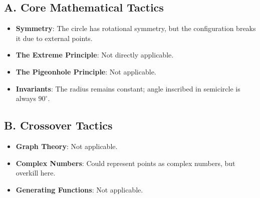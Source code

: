 \documentclass[]{article}
\begin{document}
\begin{tacticalbox}
\subsection*{A. Core Mathematical Tactics}
\begin{itemize}[leftmargin=*]
    \item \textbf{Symmetry}: The circle has rotational symmetry, but the configuration breaks it due to external points.
    \item \textbf{The Extreme Principle}: Not directly applicable.
    \item \textbf{The Pigeonhole Principle}: Not applicable.
    \item \textbf{Invariants}: The radius remains constant; angle inscribed in semicircle is always $90^\circ$.
\end{itemize}

\subsection*{B. Crossover Tactics}
\begin{itemize}[leftmargin=*]
    \item \textbf{Graph Theory}: Not applicable.
    \item \textbf{Complex Numbers}: Could represent points as complex numbers, but overkill here.
    \item \textbf{Generating Functions}: Not applicable.
\end{itemize}
\end{tacticalbox}
\end{document}
